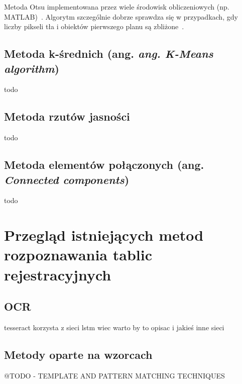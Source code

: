 Metoda Otsu implementowana przez wiele środowisk obliczeniowych (np. MATLAB)~\cite{otsu_inzynieria_rolnicza}.
Algorytm szczególnie dobrze sprawdza się w przypadkach, gdy liczby pikseli tła i obiektów pierwszego planu są zbliżone~\cite{10.1117/1.1631315}.

\subsection{Metoda k-średnich (ang. \textit{ang. K-Means algorithm})}
todo \cite{segmentation_kmeans}

\subsection{Metoda rzutów jasności}
todo

\subsection{Metoda elementów połączonych (ang. \textit{Connected components})}
todo


\section{Przegląd istniejących metod rozpoznawania tablic rejestracyjnych}

\subsection{OCR}
tesseract korzysta z sieci lstm wiec warto by to opisac i jakieś inne sieci

\subsection{Metody oparte na wzorcach}
@TODO - TEMPLATE AND PATTERN MATCHING TECHNIQUES